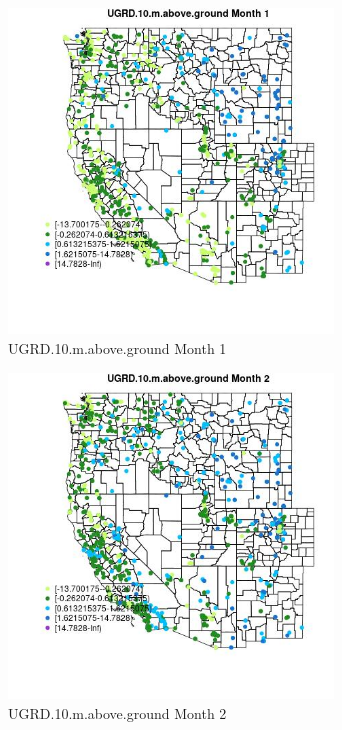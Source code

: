 \begin{figure} 
\centering  
\includegraphics[width=0.77\textwidth]{Code_Outputs/Report_ML_input_PM25_Step4_part_f_de_duplicated_aveswNAs_MapObsMo1UGRD10maboveground.jpg} 
\caption{\label{fig:Report_ML_input_PM25_Step4_part_f_de_duplicated_aveswNAsMapObsMo1UGRD10maboveground}UGRD.10.m.above.ground Month 1} 
\end{figure} 
 

\begin{figure} 
\centering  
\includegraphics[width=0.77\textwidth]{Code_Outputs/Report_ML_input_PM25_Step4_part_f_de_duplicated_aveswNAs_MapObsMo2UGRD10maboveground.jpg} 
\caption{\label{fig:Report_ML_input_PM25_Step4_part_f_de_duplicated_aveswNAsMapObsMo2UGRD10maboveground}UGRD.10.m.above.ground Month 2} 
\end{figure} 
 

